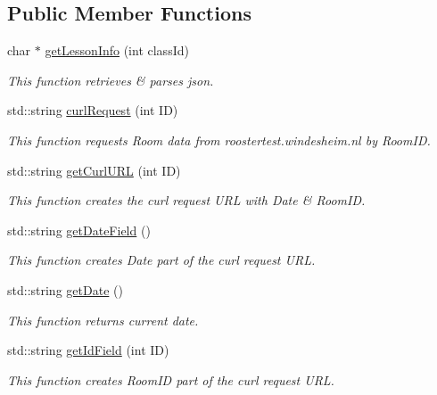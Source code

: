 \subsection*{Public Member Functions}
\begin{DoxyCompactItemize}
\item 
char $\ast$ \hyperlink{classCurlHandler_a8f82086fdc6993eb9068a25632652fb0}{get\+Lesson\+Info} (int class\+Id)
\begin{DoxyCompactList}\small\item\em This function retrieves \& parses json. \end{DoxyCompactList}\item 
std\+::string \hyperlink{classCurlHandler_a3b115e8ef11a96743b49797b4025b3a0}{curl\+Request} (int ID)
\begin{DoxyCompactList}\small\item\em This function requests Room data from roostertest.\+windesheim.\+nl by Room\+ID. \end{DoxyCompactList}\item 
std\+::string \hyperlink{classCurlHandler_a967784524e6d6d95b1d7089e3221fbfb}{get\+Curl\+U\+RL} (int ID)
\begin{DoxyCompactList}\small\item\em This function creates the curl request U\+RL with Date \& Room\+ID. \end{DoxyCompactList}\item 
std\+::string \hyperlink{classCurlHandler_a021967e447f8980a4629b85cc3683a93}{get\+Date\+Field} ()
\begin{DoxyCompactList}\small\item\em This function creates Date part of the curl request U\+RL. \end{DoxyCompactList}\item 
std\+::string \hyperlink{classCurlHandler_af36e06319f16a97938bfb9a2ee8c0fa6}{get\+Date} ()
\begin{DoxyCompactList}\small\item\em This function returns current date. \end{DoxyCompactList}\item 
std\+::string \hyperlink{classCurlHandler_a26d8a6f384d54fd7af70fde33232531a}{get\+Id\+Field} (int ID)
\begin{DoxyCompactList}\small\item\em This function creates Room\+ID part of the curl request U\+RL. \end{DoxyCompactList}\item 

\end{DoxyCompactItemize}
